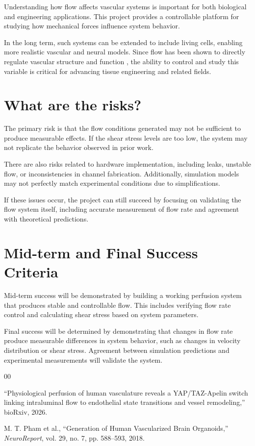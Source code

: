 \documentclass[conference]{IEEEtran}
\begin{document}
Understanding how flow affects vascular systems is important for both biological and engineering applications. This project provides a controllable platform for studying how mechanical forces influence system behavior.

In the long term, such systems can be extended to include living cells, enabling more realistic vascular and neural models. Since flow has been shown to directly regulate vascular structure and function \cite{yap2026}, the ability to control and study this variable is critical for advancing tissue engineering and related fields.

\section{What are the risks?}

The primary risk is that the flow conditions generated may not be sufficient to produce measurable effects. If the shear stress levels are too low, the system may not replicate the behavior observed in prior work.

There are also risks related to hardware implementation, including leaks, unstable flow, or inconsistencies in channel fabrication. Additionally, simulation models may not perfectly match experimental conditions due to simplifications.

If these issues occur, the project can still succeed by focusing on validating the flow system itself, including accurate measurement of flow rate and agreement with theoretical predictions.

\section{Mid-term and Final Success Criteria}

Mid-term success will be demonstrated by building a working perfusion system that produces stable and controllable flow. This includes verifying flow rate control and calculating shear stress based on system parameters.

Final success will be determined by demonstrating that changes in flow rate produce measurable differences in system behavior, such as changes in velocity distribution or shear stress. Agreement between simulation predictions and experimental measurements will validate the system.

\begin{thebibliography}{00}

“Physiological perfusion of human vasculature reveals a YAP/TAZ-Apelin switch linking intraluminal flow to endothelial state transitions and vessel remodeling,” bioRxiv, 2026.

M. T. Pham et al., “Generation of Human Vascularized Brain Organoids,” \textit{NeuroReport}, vol. 29, no. 7, pp. 588–593, 2018.

\end{thebibliography}
\end{document}
